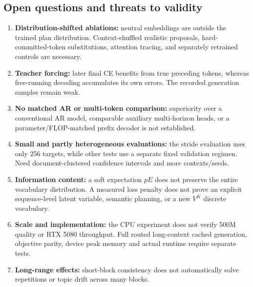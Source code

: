 \documentclass[11pt,letterpaper]{article}
\begin{document}
\subsection{Open questions and threats to validity}
\begin{enumerate}
\item \textbf{Distribution-shifted ablations:} neutral embeddings are outside the trained plan distribution. Context-shuffled realistic proposals, hard-committed-token substitutions, attention tracing, and separately retrained controls are necessary.
\item \textbf{Teacher forcing:} later final CE benefits from true preceding tokens, whereas free-running decoding accumulates its own errors. The recorded generation samples remain weak.
\item \textbf{No matched AR or multi-token comparison:} superiority over a conventional AR model, comparable auxiliary multi-horizon heads, or a parameter/FLOP-matched prefix decoder is not established.
\item \textbf{Small and partly heterogeneous evaluations:} the stride evaluation uses only 256 targets, while other tests use a separate fixed validation regimen. Need document-clustered confidence intervals and more contexts/seeds.
\item \textbf{Information content:} a soft expectation $pE$ does not preserve the entire vocabulary distribution. A measured loss penalty does not prove an explicit sequence-level latent variable, semantic planning, or a new $V^K$ discrete vocabulary.
\item \textbf{Scale and implementation:} the CPU experiment does not verify 500M quality or RTX 5080 throughput. Full routed long-context cached generation, objective parity, device peak memory and actual runtime require separate tests.
\item \textbf{Long-range effects:} short-block consistency does not automatically solve repetitions or topic drift across many blocks.
\end{enumerate}
\end{document}
